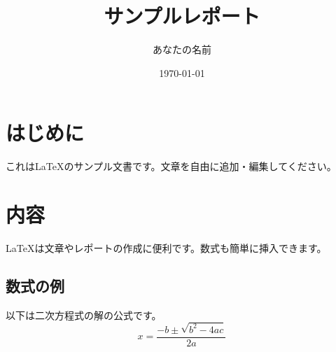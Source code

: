 \documentclass{article}
\title{サンプルレポート}
\author{あなたの名前}
\date{\today}
\begin{document}
\maketitle
\section{はじめに}
これはLaTeXのサンプル文書です。文章を自由に追加・編集してください。
\section{内容}
\LaTeX は文章やレポートの作成に便利です。数式も簡単に挿入できます。
\subsection{数式の例}
以下は二次方程式の解の公式です。
\[ x = \frac{-b \pm \sqrt{b^2 - 4ac}}{2a} \]
\end{document}
